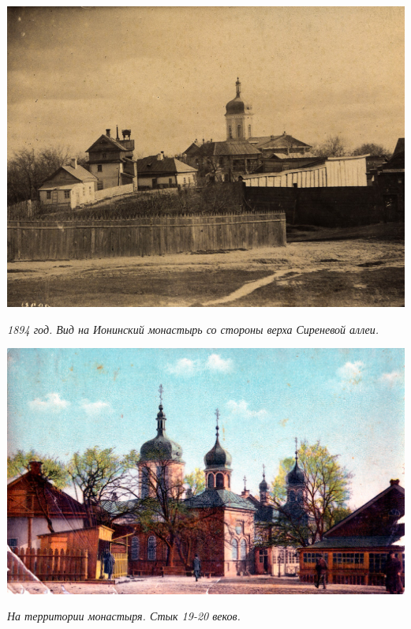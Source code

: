 \begin{center}
\includegraphics[width=\linewidth]{chast-vosp/zver/1890x-ion.jpeg}

\textit{1894 год. Вид на Ионинский монастырь со стороны верха Сиреневой аллеи.}
\end{center}
\vspace*{\fill}


\begin{center}
\includegraphics[width=\linewidth]{chast-vosp/zver/s-ion-complex-02.jpg}

\textit{На территории монастыря. Стык 19-20 веков.}
\end{center}
\vspace*{\fill}


